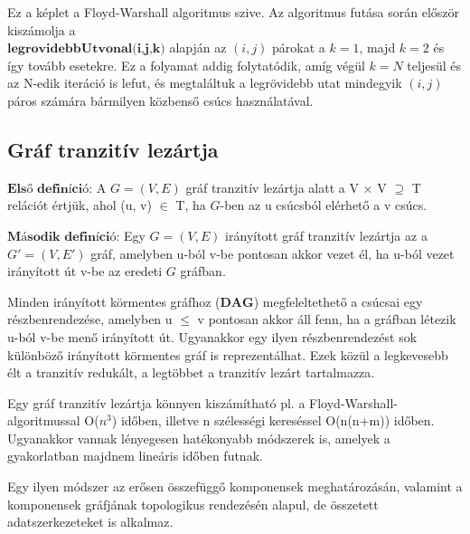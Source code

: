 \documentclass[margin=0px]{article}
\begin{document}
Ez a képlet a Floyd-Warshall algoritmus szive. Az algoritmus futása során először kiszámolja a\\
$\textbf{legrovidebbUtvonal(i,j,k)}$ alapján az $(i,j)$ párokat a $k = 1$, majd $k = 2$ és így tovább esetekre. Ez a folyamat addig folytatódik, amíg végül $k = N$ teljesül és az N-edik iteráció is lefut, és megtaláltuk a legrövidebb utat mindegyik $(i,j)$ páros számára bármilyen közbenső csúcs használatával.

\subsection{Gráf tranzitív lezártja}
$\textbf{Első definíció:}$ A $G = (V, E)$ gráf tranzitív lezártja alatt a V × V $\supseteq$ T relációt értjük, ahol (u, v) $\in$ T, ha $G$-ben az u csúcsból elérhető a v csúcs.

\begin{flushleft}
$\textbf{Második definíció:}$ Egy $G = (V,E)$ irányított gráf tranzitív lezártja az a $G' =(V,E')$ gráf, amelyben u-ból v-be pontosan akkor vezet él, ha u-ból vezet irányított út v-be az eredeti $G$ gráfban.\\
\end{flushleft}

Minden irányított körmentes gráfhoz ($\textbf{DAG}$) megfeleltethető a csúcsai egy részbenrendezése, amelyben u $\le$ v pontosan akkor áll fenn, ha a gráfban létezik u-ból v-be menő irányított út. Ugyanakkor egy ilyen részbenrendezést sok különböző irányított körmentes gráf is reprezentálhat. Ezek közül a legkevesebb élt a tranzitív redukált, a legtöbbet a tranzitív lezárt tartalmazza.

Egy gráf tranzitív lezártja könnyen kiszámítható pl. a Floyd-Warshall-algoritmussal O($n^{3}$) időben, illetve n szélességi kereséssel O(n(n+m)) időben. Ugyanakkor vannak lényegesen hatékonyabb módszerek is, amelyek a gyakorlatban majdnem lineáris időben futnak.

Egy ilyen módszer az erősen összefüggő komponensek meghatározásán, valamint a komponensek gráfjának topologikus rendezésén alapul, de összetett adatszerkezeteket is alkalmaz.
\end{document}

